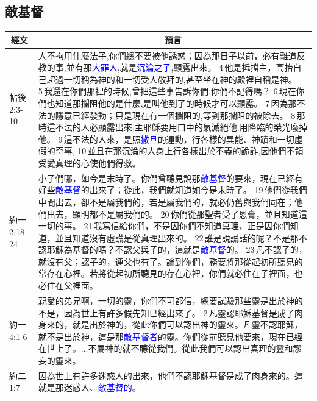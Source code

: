 \subsection{敵基督}
\begin{table}[H]
\centering
\begin{tabular}{p{1.6cm}|p{}}\hline\hline
\multicolumn{1}{c|}{經文}&\multicolumn{1}{c}{預言}\\\hline

帖後2:3-10&人不拘用什麼法子,你們總不要被他誘惑；因為那日子以前，必有離道反教的事,並有那\textcolor{blue}{大罪人},就是\textcolor{blue}{沉淪之子},顯露出來。 4 他是抵擋主，高抬自己超過一切稱為神的和一切受人敬拜的,甚至坐在神的殿裡自稱是神。 5 我還在你們那裡的時候,曾把這些事告訴你們,你們不記得嗎？ 6 現在你們也知道那攔阻他的是什麼,是叫他到了的時候才可以顯露。 7 因為那不法的隱意已經發動；只是現在有一個攔阻的,等到那攔阻的被除去。 8 那時這不法的人必顯露出來,主耶穌要用口中的氣滅絕他,用降臨的榮光廢掉他。 9 這不法的人來，是照\textcolor{blue}{撒旦}的運動，行各樣的異能、神蹟和一切虛假的奇事, 10 並且在那沉淪的人身上行各樣出於不義的詭詐,因他們不領受愛真理的心使他們得救。\\\hline

約一2:18-24&小子們哪，如今是末時了。你們曾聽見說那\textcolor{blue}{敵基督}的要來，現在已經有好些\textcolor{blue}{敵基督}的出來了；從此，我們就知道如今是末時了。 19 他們從我們中間出去，卻不是屬我們的，若是屬我們的，就必仍舊與我們同在；他們出去，顯明都不是屬我們的。 20 你們從那聖者受了恩膏，並且知道這一切的事。 21 我寫信給你們，不是因你們不知道真理，正是因你們知道，並且知道沒有虛謊是從真理出來的。 22 誰是說謊話的呢？不是那不認耶穌為基督的嗎？不認父與子的，這就是\textcolor{blue}{敵基督}的。 23 凡不認子的，就沒有父；認子的，連父也有了。論到你們，務要將那從起初所聽見的常存在心裡。若將從起初所聽見的存在心裡，你們就必住在子裡面，也必住在父裡面。\\\hline


約一4:1-6&親愛的弟兄啊，一切的靈，你們不可都信，總要試驗那些靈是出於神的不是，因為世上有許多假先知已經出來了。 2 凡靈認耶穌基督是成了肉身來的，就是出於神的，從此你們可以認出神的靈來。凡靈不認耶穌，就不是出於神，這是那\textcolor{blue}{敵基督者}的靈。你們從前聽見他要來，現在已經在世上了。...不屬神的就不聽從我們。從此我們可以認出真理的靈和謬妄的靈來。\\\hline

約二1:7&因為世上有許多迷惑人的出來，他們不認耶穌基督是成了肉身來的。這就是那迷惑人、\textcolor{blue}{敵基督的}。\\\hline


\end{tabular}
\end{table}
